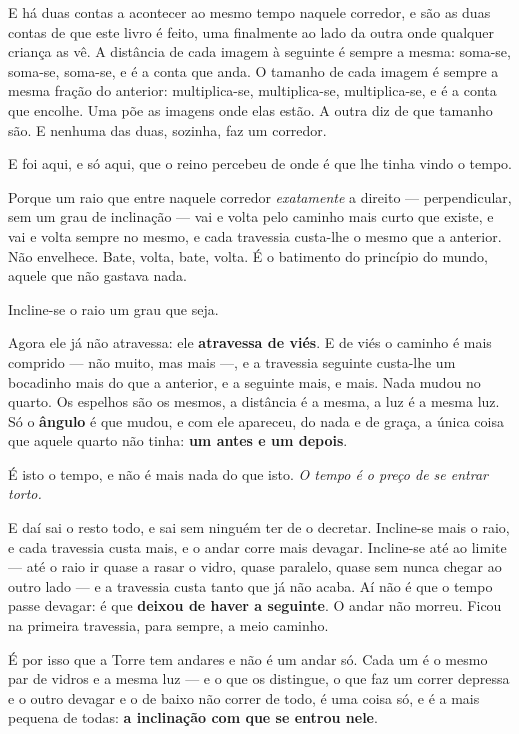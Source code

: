 \documentclass[livro.tex]{subfiles}
\begin{document}
E há duas contas a acontecer ao mesmo tempo naquele corredor, e são as duas contas de que
este livro é feito, uma finalmente ao lado da outra onde qualquer criança as vê. A
distância de cada imagem à seguinte é sempre a mesma: soma-se, soma-se, soma-se, e é a
conta que anda. O tamanho de cada imagem é sempre a mesma fração do anterior:
multiplica-se, multiplica-se, multiplica-se, e é a conta que encolhe. Uma põe as imagens
onde elas estão. A outra diz de que tamanho são. E nenhuma das duas, sozinha, faz um
corredor.

\medskip

E foi aqui, e só aqui, que o reino percebeu de onde é que lhe tinha vindo o tempo.

Porque um raio que entre naquele corredor \emph{exatamente} a direito --- perpendicular,
sem um grau de inclinação --- vai e volta pelo caminho mais curto que existe, e vai e
volta sempre no mesmo, e cada travessia custa-lhe o mesmo que a anterior. Não envelhece.
Bate, volta, bate, volta. É o batimento do princípio do mundo, aquele que não gastava
nada.

Incline-se o raio um grau que seja.

Agora ele já não atravessa: ele \textbf{atravessa de viés}. E de viés o caminho é mais
comprido --- não muito, mas mais ---, e a travessia seguinte custa-lhe um bocadinho mais
do que a anterior, e a seguinte mais, e mais. Nada mudou no quarto. Os espelhos são os
mesmos, a distância é a mesma, a luz é a mesma luz. Só o \textbf{ângulo} é que mudou, e
com ele apareceu, do nada e de graça, a única coisa que aquele quarto não tinha:
\textbf{um antes e um depois}.

É isto o tempo, e não é mais nada do que isto. \emph{O tempo é o preço de se entrar
torto.}

\medskip

E daí sai o resto todo, e sai sem ninguém ter de o decretar. Incline-se mais o raio, e
cada travessia custa mais, e o andar corre mais devagar. Incline-se até ao limite --- até
o raio ir quase a rasar o vidro, quase paralelo, quase sem nunca chegar ao outro lado ---
e a travessia custa tanto que já não acaba. Aí não é que o tempo passe devagar: é que
\textbf{deixou de haver a seguinte}. O andar não morreu. Ficou na primeira travessia,
para sempre, a meio caminho.

É por isso que a Torre tem andares e não é um andar só. Cada um é o mesmo par de vidros e
a mesma luz --- e o que os distingue, o que faz um correr depressa e o outro devagar e o
de baixo não correr de todo, é uma coisa só, e é a mais pequena de todas: \textbf{a
inclinação com que se entrou nele}.
\end{document}
